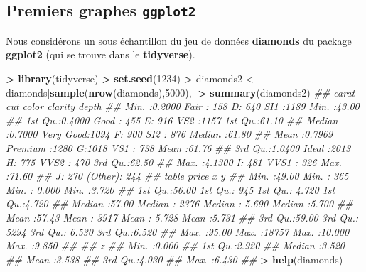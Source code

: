 \documentclass[]{book}
\newenvironment{Shaded}{\begin{snugshade}}{\end{snugshade}}
\newcommand{\CommentTok}[1]{\textcolor[rgb]{0.56,0.35,0.01}{\textit{#1}}}
\newcommand{\DecValTok}[1]{\textcolor[rgb]{0.00,0.00,0.81}{#1}}
\newcommand{\KeywordTok}[1]{\textcolor[rgb]{0.13,0.29,0.53}{\textbf{#1}}}
\newcommand{\NormalTok}[1]{#1}
\newcommand{\OperatorTok}[1]{\textcolor[rgb]{0.81,0.36,0.00}{\textbf{#1}}}
\newcommand{\StringTok}[1]{\textcolor[rgb]{0.31,0.60,0.02}{#1}}
\theoremstyle{definition}
\theoremstyle{definition}
\theoremstyle{definition}
\theoremstyle{remark}
\begin{document}
\hypertarget{premiers-graphes-ggplot2}{%
\subsection{\texorpdfstring{Premiers graphes \texttt{ggplot2}}{Premiers graphes ggplot2}}\label{premiers-graphes-ggplot2}}

Nous considérons un sous échantillon du jeu de données \textbf{diamonds} du package \textbf{ggplot2} (qui se trouve dans le \textbf{tidyverse}).

\begin{Shaded}
\begin{Highlighting}[]
\OperatorTok{>}\StringTok{ }\KeywordTok{library}\NormalTok{(tidyverse)}
\OperatorTok{>}\StringTok{ }\KeywordTok{set.seed}\NormalTok{(}\DecValTok{1234}\NormalTok{)}
\OperatorTok{>}\StringTok{ }\NormalTok{diamonds2 <-}\StringTok{ }\NormalTok{diamonds[}\KeywordTok{sample}\NormalTok{(}\KeywordTok{nrow}\NormalTok{(diamonds),}\DecValTok{5000}\NormalTok{),] }
\OperatorTok{>}\StringTok{ }\KeywordTok{summary}\NormalTok{(diamonds2)}
\CommentTok{##      carat               cut       color       clarity         depth      }
\CommentTok{##  Min.   :0.2000   Fair     : 158   D: 640   SI1    :1189   Min.   :43.00  }
\CommentTok{##  1st Qu.:0.4000   Good     : 455   E: 916   VS2    :1157   1st Qu.:61.10  }
\CommentTok{##  Median :0.7000   Very Good:1094   F: 900   SI2    : 876   Median :61.80  }
\CommentTok{##  Mean   :0.7969   Premium  :1280   G:1018   VS1    : 738   Mean   :61.76  }
\CommentTok{##  3rd Qu.:1.0400   Ideal    :2013   H: 775   VVS2   : 470   3rd Qu.:62.50  }
\CommentTok{##  Max.   :4.1300                    I: 481   VVS1   : 326   Max.   :71.60  }
\CommentTok{##                                    J: 270   (Other): 244                  }
\CommentTok{##      table           price             x                y        }
\CommentTok{##  Min.   :49.00   Min.   :  365   Min.   : 0.000   Min.   :3.720  }
\CommentTok{##  1st Qu.:56.00   1st Qu.:  945   1st Qu.: 4.720   1st Qu.:4.720  }
\CommentTok{##  Median :57.00   Median : 2376   Median : 5.690   Median :5.700  }
\CommentTok{##  Mean   :57.43   Mean   : 3917   Mean   : 5.728   Mean   :5.731  }
\CommentTok{##  3rd Qu.:59.00   3rd Qu.: 5294   3rd Qu.: 6.530   3rd Qu.:6.520  }
\CommentTok{##  Max.   :95.00   Max.   :18757   Max.   :10.000   Max.   :9.850  }
\CommentTok{##                                                                  }
\CommentTok{##        z        }
\CommentTok{##  Min.   :0.000  }
\CommentTok{##  1st Qu.:2.920  }
\CommentTok{##  Median :3.520  }
\CommentTok{##  Mean   :3.538  }
\CommentTok{##  3rd Qu.:4.030  }
\CommentTok{##  Max.   :6.430  }
\CommentTok{## }
\OperatorTok{>}\StringTok{ }\KeywordTok{help}\NormalTok{(diamonds)}
\end{Highlighting}
\end{Shaded}
\end{document}
